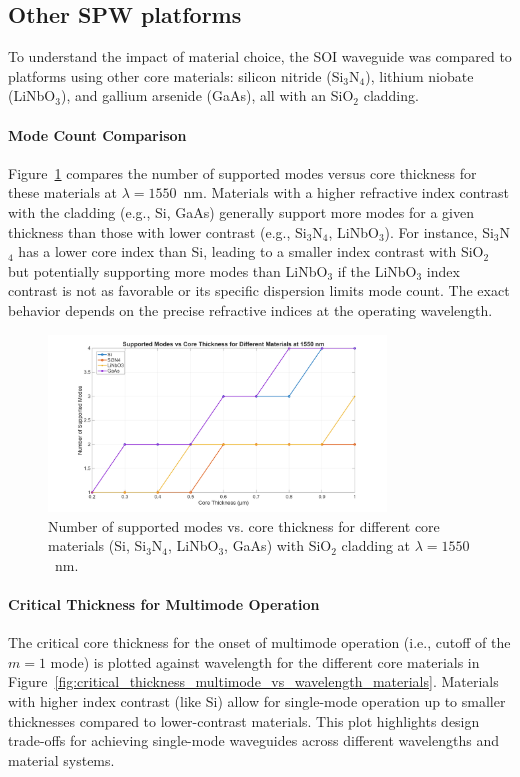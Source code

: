 \documentclass[10pt, a4paper]{article}
\begin{document}
\subsection{Other SPW platforms}
To understand the impact of material choice, the SOI waveguide was compared to platforms using other core materials: silicon nitride (Si$_3$N$_4$), lithium niobate (LiNbO$_3$), and gallium arsenide (GaAs), all with an SiO$_2$ cladding.

\paragraph{Mode Count Comparison}
Figure~\ref{fig:modes_vs_thickness_materials_1550nm} compares the number of supported modes versus core thickness for these materials at $\lambda = 1550$~nm. Materials with a higher refractive index contrast with the cladding (e.g., Si, GaAs) generally support more modes for a given thickness than those with lower contrast (e.g., Si$_3$N$_4$, LiNbO$_3$). For instance, Si$_3$N$_4$ has a lower core index than Si, leading to a smaller index contrast with SiO$_2$ but potentially supporting more modes than LiNbO$_3$ if the LiNbO$_3$ index contrast is not as favorable or its specific dispersion limits mode count. The exact behavior depends on the precise refractive indices at the operating wavelength.

\begin{figure}[h!]
    \centering
    \includegraphics[width=0.8\textwidth]{task1/modes_vs_thickness_materials_1550nm.png}
    \caption{Number of supported modes vs. core thickness for different core materials (Si, Si$_3$N$_4$, LiNbO$_3$, GaAs) with SiO$_2$ cladding at $\lambda = 1550$~nm.}
    \label{fig:modes_vs_thickness_materials_1550nm}
\end{figure}

\paragraph{Critical Thickness for Multimode Operation}
The critical core thickness for the onset of multimode operation (i.e., cutoff of the $m=1$ mode) is plotted against wavelength for the different core materials in Figure~\ref{fig:critical_thickness_multimode_vs_wavelength_materials}. Materials with higher index contrast (like Si) allow for single-mode operation up to smaller thicknesses compared to lower-contrast materials. This plot highlights design trade-offs for achieving single-mode waveguides across different wavelengths and material systems.
\end{document}

